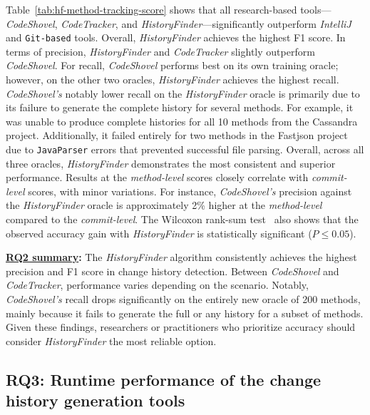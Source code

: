 Table~\ref{tab:hf-method-tracking-score} shows that all research-based tools—\textit{CodeShovel}, \textit{CodeTracker}, and \textit{HistoryFinder}—significantly outperform \textit{IntelliJ} and \texttt{Git-based} tools. Overall, \textit{HistoryFinder} achieves the highest F1 score. In terms of precision, \textit{HistoryFinder} and \textit{CodeTracker} slightly outperform \textit{CodeShovel}. For recall, \textit{CodeShovel} performs best on its own training oracle; however, on the other two oracles, \textit{HistoryFinder} achieves the highest recall. \textit{CodeShovel’s} notably lower recall on the \textit{HistoryFinder} oracle is primarily due to its failure to generate the complete history for several methods. For example, it was unable to produce complete histories for all 10 methods from the Cassandra project. Additionally, it failed entirely for two methods in the Fastjson project due to \texttt{JavaParser} errors that prevented successful file parsing. Overall, across all three oracles, \textit{HistoryFinder} demonstrates the most consistent and superior performance. Results at the \emph{method-level} scores closely correlate with \emph{commit-level} scores, with minor variations. For instance, \textit{CodeShovel's} precision against the \textit{HistoryFinder} oracle is approximately 2\% higher at the \emph{method-level} compared to the \emph{commit-level}.
The Wilcoxon rank-sum test~\cite{wilcoxon_individual_1945} also shows that the observed accuracy gain with \textit{HistoryFinder} is statistically significant ($P \le 0.05$).

\begin{tcolorbox}
\noindent\textbf{\underline{RQ2 summary}:}
The \textit{HistoryFinder} algorithm consistently achieves the highest precision and F1 score in change history detection. Between \textit{CodeShovel} and \textit{CodeTracker}, performance varies depending on the scenario. Notably, \textit{CodeShovel's} recall drops significantly on the entirely new oracle of 200 methods, mainly because it fails to generate the full or any history for a subset of methods. Given these findings, researchers or practitioners who prioritize accuracy should consider \textit{HistoryFinder} the most reliable option.
\end{tcolorbox}

\subsection{RQ3: Runtime performance of the change history generation tools}
\label{sec:rq3-runtime}

